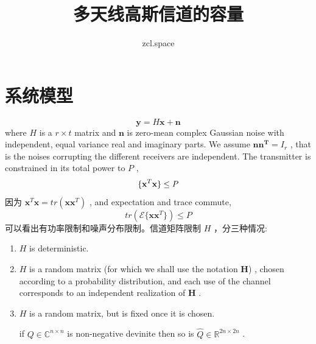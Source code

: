 \documentclass[10pt,a4paper,UTF8]{article}
\author{zcl.space}
\date{}
\title{多天线高斯信道的容量}
\begin{document}
\maketitle
\tableofcontents
{}
\newpage


\section{系统模型}
\label{sec:org0539f85}
\begin{equation}
  \label{eq:20120322y}
  \mathbf{y} = H\mathbf{x} + \mathbf{n}
\end{equation}
where \(H\) is a \(r\times t\) matrix and \(\mathbf{n}\) is zero-mean complex Gaussian noise with independent, equal variance real and imaginary parts. We assume \(\mathcal{\mathbf{nn^{T}}}= I_r\) , that is the noises corrupting the different receivers are independent. The transmitter is constrained in its total power to \(P\) ,
\begin{equation}
  \label{eq:20120322varepsilon}
  \mathcal\{\mathbf{x}^{T} \mathbf{x}\} \le P
\end{equation}
因为 \(\mathbf{x}^{T}\mathbf{x} = tr(\mathbf{x}\mathbf{x}^{T})\) , and expectation and trace commute,
\begin{equation}
  \label{eq:20120322tr}
  tr(\mathcal{E}\{\mathbf{x}\mathbf{x}^{T}\}) \le P
\end{equation}
可以看出有功率限制和噪声分布限制。信道矩阵限制 \(H\) ，分三种情况:
\begin{enumerate}
\item \(H\)  is deterministic.
\item \(H\)  is a random matrix (for which we shall use the notation  \(\pmb{H}\)) , chosen according to a probability distribution, and each use of the channel corresponds to an independent realization of  \(\pmb{H}\) .
\item \(H\)  is a random matrix, but is fixed once it is chosen.

if \(Q\in \mathbb{C}^{n\times n}\) is non-negative devinite then so is \(\hat{Q}\in \mathbb{R}^{2n\times 2n}\) .
\end{enumerate}
\end{document}
